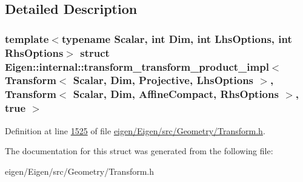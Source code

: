 \subsection{Detailed Description}
\subsubsection*{template$<$typename Scalar, int Dim, int Lhs\+Options, int Rhs\+Options$>$\newline
struct Eigen\+::internal\+::transform\+\_\+transform\+\_\+product\+\_\+impl$<$ Transform$<$ Scalar, Dim, Projective, Lhs\+Options $>$, Transform$<$ Scalar, Dim, Affine\+Compact, Rhs\+Options $>$, true $>$}



Definition at line \hyperlink{eigen_2_eigen_2src_2_geometry_2_transform_8h_source_l01525}{1525} of file \hyperlink{eigen_2_eigen_2src_2_geometry_2_transform_8h_source}{eigen/\+Eigen/src/\+Geometry/\+Transform.\+h}.



The documentation for this struct was generated from the following file\+:\begin{DoxyCompactItemize}
\item 
eigen/\+Eigen/src/\+Geometry/\+Transform.\+h\end{DoxyCompactItemize}

